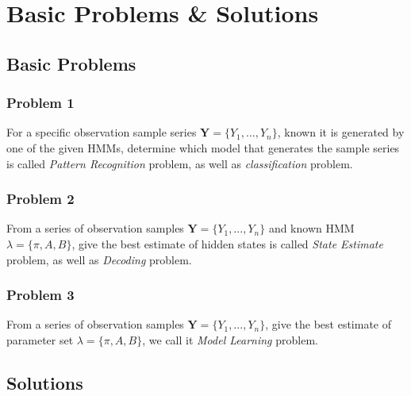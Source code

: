 \documentclass[runningheads]{llncs}
\begin{document}
\section{Basic Problems \& Solutions}
\subsection{Basic Problems}
\subsubsection{Problem 1}
For a specific observation sample series $\mathbf{Y} = \{ Y_1, ..., Y_n \} $,
known it is generated by one of the given HMMs, determine which model that generates the 
sample series is called \emph{Pattern Recognition} problem, as well as \emph{classification} problem.
\subsubsection{Problem 2}
From a series of observation samples $\mathbf{Y} = \{ Y_1, ..., Y_n \} $ and known HMM
$\lambda = \{ \pi, A, B \} $, give the best estimate of hidden states is called \emph{State Estimate}
problem, as well as \emph{Decoding} problem.
\subsubsection{Problem 3}
From a series of observation samples $\mathbf{Y} = \{ Y_1, ..., Y_n \} $,
give the best estimate of parameter set $\lambda = \{ \pi, A, B \} $,
we call it \emph{Model Learning} problem.

\subsection{Solutions}
\end{document}
